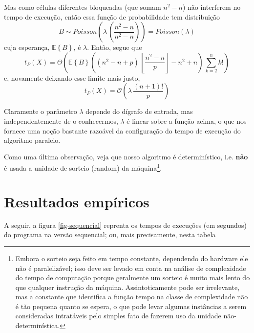 \documentclass[a4paper,article,10pt]{article}
\newcommand{\bE}{\mathbb{E}}
\newcommand{\chaves}[1] {{\left \{ {#1} \right \}}}
\newcommand{\parenteses}[1] {\left ( {#1} \right )}
\newcommand{\floor}[1] {\left \lfloor {#1} \right \rfloor}
\newcommand{\floorfrac}[2] {\floor{\frac{#1}{#2}}}
\begin{document}
    Mas como células diferentes bloqueadas (que somam $n^2 - n$) não interferem
    no tempo de execução, então essa função de probabilidade tem distribuição
    \begin{equation*}
      B \sim Poisson\parenteses{\lambda\,\parenteses{\frac{n^2 - n}{n^2 - n}}}
           = Poisson(\lambda)
    \end{equation*}
    cuja esperança, $\bE\chaves{B}$, é $\lambda$. Então, segue que
    \begin{equation*}
      t_P(X) = \Theta\parenteses{\bE\chaves{B} \parenteses{(n^2 -
          n+p)\,\floorfrac{n^2-n}{p} - n^2 + n}\,\sum_{k=2}^n k!}
    \end{equation*}
    e, novamente deixando esse limite mais justo,
    \begin{equation*}
      t_P(X) = \mathcal{O}\parenteses{\lambda\,\frac{(n+1)!}{p}}
    \end{equation*}

    Claramente o parâmetro $\lambda$ depende do dígrafo de entrada, mas
    independentemente de o conhecermos, $\lambda$ é linear sobre a função acima,
    o que nos fornece uma noção bastante razoável da configuração do tempo de
    execução do algoritmo paralelo.

    Como uma última observação, veja que nosso algoritmo é determinístico,
    i.e. {\bf não} é usada a unidade de sorteio (random) da máquina\footnote{
    Embora o sorteio seja feito em tempo constante, dependendo do hardware ele
    não é paralelizável; isso deve ser levado em conta na análise de
    complexidade do tempo de computação porque geralmente um sorteio é muito
    mais lento do que qualquer instrução da máquina.
    Assintoticamente pode ser irrelevante, mas a constante que identifica a
    função tempo na classe de complexidade não é tão pequena quanto se espera, o
    que pode levar algumas instâncias a serem consideradas intratáveis pelo
    simples fato de fazerem uso da unidade não-determinística.}.

    \pagebreak 
  \section{Resultados empíricos}

    A seguir, a figura \ref{fig-sequencial} reprenta os tempos de execuções
    (em segundos) do programa na versão sequencial; ou, mais precisamente, nesta
    tabela
\end{document}

